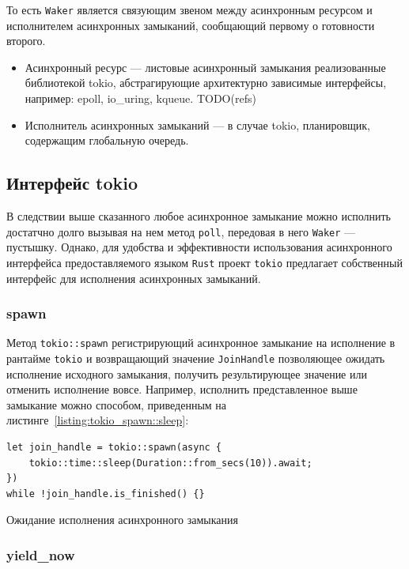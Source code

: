 То есть \verb|Waker| является связующим звеном между асинхронным ресурсом и исполнителем асинхронных замыканий, сообщающий первому о готовности второго.

\begin{itemize}
    \item Асинхронный ресурс --- листовые асинхронный замыкания реализованные библиотекой tokio, абстрагирующие архитектурно зависимые интерфейсы, например: epoll, io\_uring, kqueue. TODO(refs)
    \item Исполнитель асинхронных замыканий --- в случае tokio, планировщик, содержащим глобальную очередь.
\end{itemize}

\subsection{Интерфейс tokio}

В следствии выше сказанного любое асинхронное замыкание можно исполнить достатчно долго вызывая на нем метод \verb|poll|, передовая в него \verb|Waker| --- пустышку. Однако, для удобства и эффективности использования асинхронного интерфейса предоставляемого языком \verb|Rust| проект \verb|tokio| предлагает собственный интерфейс для исполнения асинхронных замыканий.

\subsubsection{spawn}

Метод \verb|tokio::spawn| регистрирующий асинхронное замыкание на исполнение в рантайме \verb|tokio| и возвращающий значение \verb|JoinHandle| позволяющее ожидать исполнение исходного замыкания, получить результирующее значение или отменить исполнение вовсе. Например, исполнить представленное выше замыкание можно способом, приведенным на листинге~\ref{listing:tokio_spawn::sleep}:

\begin{listing}[H]
    \begin{verbatim}
let join_handle = tokio::spawn(async {
    tokio::time::sleep(Duration::from_secs(10)).await;
})
while !join_handle.is_finished() {}
    \end{verbatim}

    \caption{Ожидание исполнения асинхронного замыкания}
    \label{listing:tokio_spawn::sleep}
\end{listing}

\subsubsection{yield\_now}

